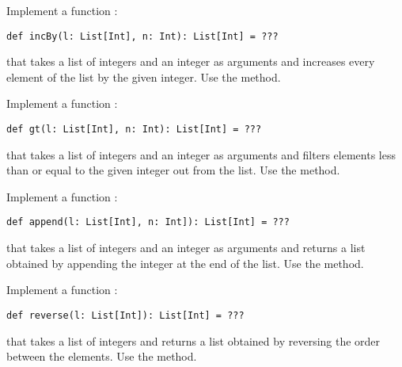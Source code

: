 \begin{exercise}

Implement a function :
\begin{verbatim}
def incBy(l: List[Int], n: Int): List[Int] = ???
\end{verbatim}
that takes a list of integers and an integer as
arguments and increases every element of the list by the given integer. Use
the  method.

\end{exercise}

\begin{exercise}

Implement a function :
\begin{verbatim}
def gt(l: List[Int], n: Int): List[Int] = ???
\end{verbatim}
that takes a list of integers and an integer as arguments
and filters elements less than or equal to the given integer out from the list.
Use the  method.

\end{exercise}

\begin{exercise}

Implement a function :
\begin{verbatim}
def append(l: List[Int], n: Int]): List[Int] = ???
\end{verbatim}
that takes a list of integers and an integer as arguments
and returns a list obtained by appending the integer at the end of the list.
Use the  method.

\end{exercise}

\begin{exercise}

Implement a function :
\begin{verbatim}
def reverse(l: List[Int]): List[Int] = ???
\end{verbatim}
that takes a list of integers
and returns a list obtained by reversing the order between the elements.
Use the  method.

\end{exercise}
